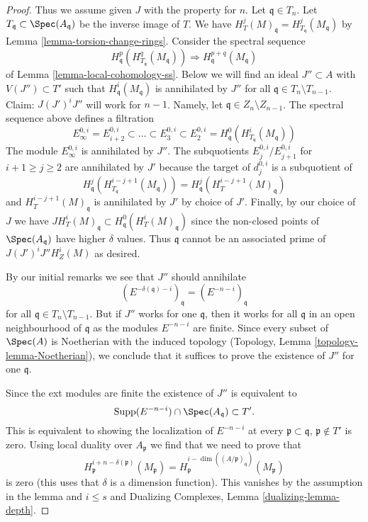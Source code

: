 \begin{proof}
\medskip\noindent
Thus we assume given $J$ with the property for $n$.
Let $\mathfrak q \in T_n$. Let $T_\mathfrak q \subset \Spec(A_\mathfrak q)$
be the inverse image of $T$. We have
$H^j_T(M)_\mathfrak q = H^j_{T_\mathfrak q}(M_\mathfrak q)$
by Lemma \ref{lemma-torsion-change-rings}.
Consider the spectral sequence
$$
H_\mathfrak q^p(H^q_{T_\mathfrak q}(M_\mathfrak q))
\Rightarrow
H^{p + q}_\mathfrak q(M_\mathfrak q)
$$
of Lemma \ref{lemma-local-cohomology-ss}.
Below we will find an ideal $J'' \subset A$ with $V(J'') \subset T'$
such that $H^i_\mathfrak q(M_\mathfrak q)$ is annihilated by $J''$ for all
$\mathfrak q \in T_n \setminus T_{n - 1}$.
Claim: $J (J')^i J''$ will work for $n - 1$.
Namely, let $\mathfrak q \in Z_n \setminus Z_{n - 1}$.
The spectral sequence above defines a filtration
$$
E_\infty^{0, i} = E_{i + 2}^{0, i} \subset \ldots \subset E_3^{0, i} \subset
E_2^{0, i} = H^0_\mathfrak q(H^i_{T_\mathfrak q}(M_\mathfrak q))
$$
The module $E_\infty^{0, i}$ is annihilated by $J''$.
The subquotients $E_j^{0, i}/E_{j + 1}^{0, i}$ for $i + 1 \geq j \geq 2$
are annihilated by $J'$ because the target of $d_j^{0, i}$
is a subquotient of
$$
H^j_\mathfrak q(H^{i - j + 1}_{T_\mathfrak q}(M_\mathfrak q)) =
H^j_\mathfrak q(H^{i - j + 1}_T(M)_\mathfrak q)
$$
and $H^{i - j + 1}_T(M)_\mathfrak q$ is annihilated by $J'$ by choice of $J'$.
Finally, by our choice of $J$ we have
$J H^i_T(M)_\mathfrak q \subset H^0_\mathfrak q(H^i_T(M)_\mathfrak q)$
since the non-closed points of $\Spec(A_\mathfrak q)$ have higher
$\delta$ values. Thus $\mathfrak q$ cannot be an associated prime of
$J(J')^iJ'' H^i_Z(M)$ as desired.

\medskip\noindent
By our initial remarks we see that $J''$ should annihilate
$$
(E^{-\delta(\mathfrak q) - i})_\mathfrak q =
(E^{-n - i})_\mathfrak q
$$
for all $\mathfrak q \in T_n \setminus T_{n - 1}$.
But if $J''$ works for one $\mathfrak q$, then it works for all
$\mathfrak q$ in an open neighbourhood of $\mathfrak q$
as the modules $E^{-n - i}$ are finite.
Since every subset of $\Spec(A)$ is Noetherian with the induced
topology (Topology, Lemma \ref{topology-lemma-Noetherian}),
we conclude that it suffices
to prove the existence of $J''$ for one $\mathfrak q$.

\medskip\noindent
Since the ext modules are finite the existence of $J''$ is
equivalent to
$$
\text{Supp}(E^{-n - i}) \cap \Spec(A_\mathfrak q) \subset T'.
$$
This is equivalent to showing the localization of $E^{-n - i}$ at every
$\mathfrak p \subset \mathfrak q$, $\mathfrak p \not \in T'$
is zero. Using local duality over $A_\mathfrak p$ we find that we need
to prove that
$$
H^{i + n - \delta(\mathfrak p)}_\mathfrak p(M_\mathfrak p) =
H^{i - \dim((A/\mathfrak p)_\mathfrak q)}_\mathfrak p(M_\mathfrak p)
$$
is zero (this uses that $\delta$ is a dimension function).
This vanishes by the assumption in the lemma and $i \leq s$ and
Dualizing Complexes, Lemma \ref{dualizing-lemma-depth}.


\end{proof}
